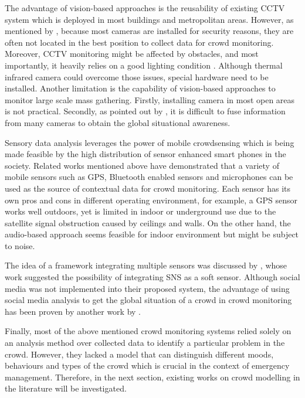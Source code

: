 The advantage of vision-based approaches is the reusability of existing CCTV system which is deployed in most buildings and metropolitan areas. However, as mentioned by \textcite{Davies1995}, because most cameras are installed for security reasons, they are often not located in the best position to collect data for crowd monitoring. Moreover, CCTV monitoring might be affected by obstacles, and most importantly, it heavily relies on a good lighting condition \parencite{Wirz2012}. Although thermal infrared camera could overcome those issues, special hardware need to be installed. Another limitation is the capability of vision-based approaches to monitor large scale mass gathering. Firstly, installing camera in most open areas is not practical. Secondly, as pointed out by \textcite{Wirz2012}, it is difficult to fuse information from many cameras to obtain the global situational awareness.

Sensory data analysis leverages the power of mobile crowdsensing which is being made feasible by the high distribution of sensor enhanced smart phones in the society. Related works mentioned above have demonstrated that a variety of mobile sensors such as GPS, Bluetooth enabled sensors and microphones can be used as the source of contextual data for crowd monitoring. Each sensor has its own pros and cons in different operating environment, for example, a GPS sensor works well outdoors, yet is limited in indoor or underground use due to the satellite signal obstruction caused by ceilings and walls. On the other hand, the audio-based approach seems feasible for indoor environment but might be subject to noise.

The idea of a framework integrating multiple sensors was discussed by \textcite{Ramesh2014}, whose work suggested the possibility of integrating SNS as a soft sensor. Although social media was not implemented into their proposed system, the advantage of using social media analysis to get the global situation of a crowd in crowd monitoring has been proven by another work by \textcite{DelirHaghighi2013}.

Finally, most of the above mentioned crowd monitoring systems relied solely on an analysis method over collected data to identify a particular problem in the crowd. However, they lacked a model that can distinguish different moods, behaviours and types of the crowd which is crucial in the context of emergency management. Therefore, in the next section, existing works on crowd modelling in the literature will be investigated.

